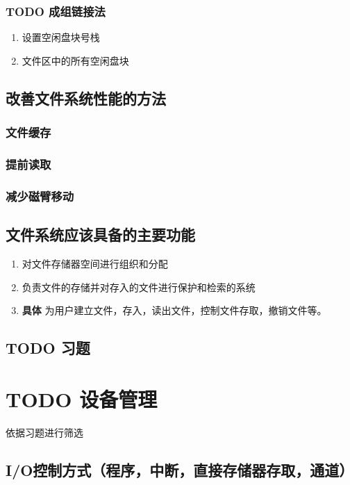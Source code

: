 \documentclass[11pt]{article}
\begin{document}
\subsubsection{{\bfseries\sffamily TODO} 成组链接法}
\label{sec-4-8-4}
\begin{enumerate}
\item 设置空闲盘块号栈
\item 文件区中的所有空闲盘块
\end{enumerate}
\subsection{改善文件系统性能的方法}
\label{sec-4-9}
\subsubsection{文件缓存}
\label{sec-4-9-1}
\subsubsection{提前读取}
\label{sec-4-9-2}
\subsubsection{减少磁臂移动}
\label{sec-4-9-3}
\subsection{文件系统应该具备的主要功能}
\label{sec-4-10}
\begin{enumerate}
\item 对文件存储器空间进行组织和分配
\item 负责文件的存储并对存入的文件进行保护和检索的系统
\item \textbf{具体} 为用户建立文件，存入，读出文件，控制文件存取，撤销文件等。
\end{enumerate}
\subsection{{\bfseries\sffamily TODO} 习题}
\label{sec-4-11}
\section{{\bfseries\sffamily TODO} 设备管理}
\label{sec-5}
依据习题进行筛选
\subsection{I/O控制方式（程序，中断，直接存储器存取，通道）}
\label{sec-5-1}
\end{document}
